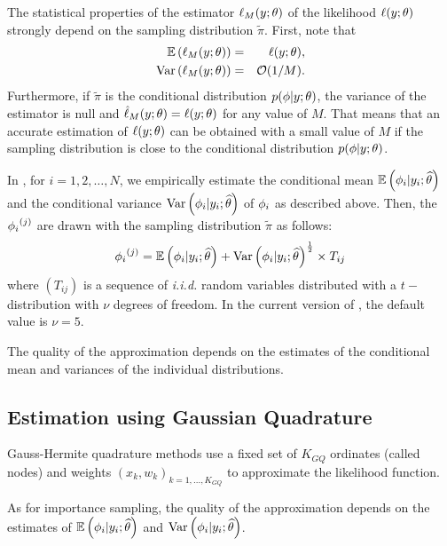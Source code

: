 The statistical properties of the estimator $\ell_M(y;{\theta})$ of the likelihood
$\ell(y;{\theta})$ strongly depend on the sampling distribution  $\tilde{\pi}$. First, note that
\begin{eqnarray*}
\mathbb{E}\left({\ell}_M(y;{\theta})\right) &=& \ell(y;{\theta}), \\
\mbox{Var}\left({\ell}_M(y;{\theta})\right) &=& {\cal O}(1/M).
\end{eqnarray*}
Furthermore, if $\tilde{\pi}$ is the conditional distribution $p(\phi|y;{\theta})$, the variance of the estimator is null and $\hat{\ell}_M(y;{\theta}) = \ell(y;{\theta})$ for any value of $M$. That means that an accurate estimation of $\ell(y;{\theta})$ can be obtained with a small value of $M$ if the sampling distribution is close to the conditional distribution $p(\phi|y;{\theta})$.

In \monolix, for $i=1,2,\ldots, N$, we empirically estimate the conditional mean $\mathbb{E}\left({{\phi}_i}|y_{i};{\widehat{\theta}}\right)$ and the conditional variance $\mbox{Var}\left({{\phi}_i}|y_{i};{\widehat{\theta}}\right)$ of ${{\phi}_i}$ as described above. Then, the ${{\phi}_i}^{(j)}$ are drawn with the sampling distribution $\tilde{\pi}$ as follows:
$${{\phi}_i}^{(j)} = \mathbb{E}\left({{\phi}_i}|y_{i};{\widehat{\theta}}\right) + \mbox{Var}\left({{\phi}_i}|y_{i};{\widehat{\theta}}\right)^{\frac{1}{2}} \times T_{ij}$$
where $(T_{ij})$ is a sequence of {\it i.i.d.} random variables distributed with a $t-$distribution with $\nu$ degrees of freedom. In the current version of \monolix, the default value is $\nu=5$. 


The quality of the approximation depends on the estimates of the conditional mean and variances of the individual distributions.

\subsection{Estimation using Gaussian Quadrature} \label{sec:gqlike}


Gauss-Hermite quadrature methods use a fixed set of $K_{GQ}$ ordinates (called nodes) and weights $(x_k, w_k)_{k=1,...,K_{GQ}}$ to approximate the likelihood function.

As for importance sampling, the quality of the approximation depends on the estimates of $\mathbb{E}\left({{\phi}_i}|y_{i};{\widehat{\theta}}\right)$ and $\mbox{Var}\left({{\phi}_i}|y_{i};{\widehat{\theta}}\right)$.

